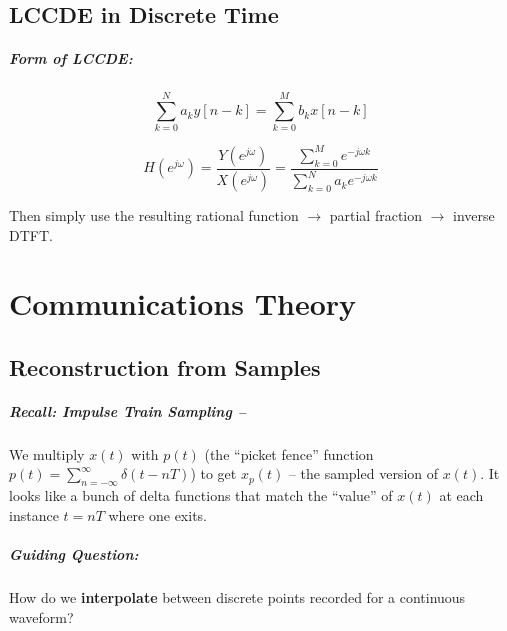 \documentclass[a4paper,12pt]{report}
\begin{document}
\section{LCCDE in Discrete Time}

\paragraph{Form of LCCDE: } 
\begin{equation}
\sum_{k = 0}^{N} a_k y[n-k] = \sum_{k=0}^{M} b_k x[n-k]
\end{equation}

\begin{equation}
H(e^{j\omega}) = \frac{Y(e^{j\omega})}{X(e^{j\omega})} = \frac{\sum_{k=0}^{M} e^{-j\omega k}}{\sum_{k=0}^{N} a_k e^{-j\omega k}}
\end{equation}

Then simply use the resulting rational function $\to$ partial fraction $\to$ inverse DTFT. 


\chapter{Communications Theory}



\section{Reconstruction from Samples}

\paragraph{Recall: Impulse Train Sampling -- } We multiply $x(t)$ with $p(t)$ (the ``picket fence'' function $p(t) = \sum_{n=-\infty}^{\infty} \delta(t-nT)$) to get $x_p(t)$ -- the sampled version of $x(t)$. It looks like a bunch of delta functions that match the ``value'' of $x(t)$ at each instance $t = nT$ where one exits. 

\paragraph{Guiding Question: } How do we \textbf{interpolate} between discrete points recorded for a continuous waveform? 
\end{document}
